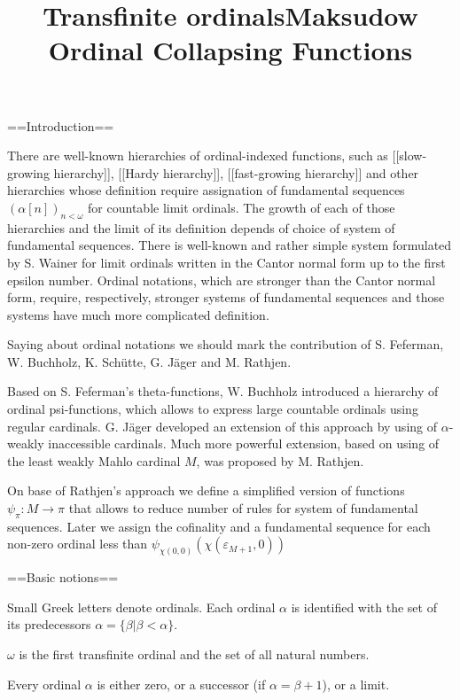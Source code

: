 \documentclass[10pt]{article}
\title{Transfinite ordinals}
\begin{document}
\title{Maksudow Ordinal Collapsing Functions}

\maketitle

\setlength{\parindent}{0pt}


==Introduction==

There are well-known hierarchies of ordinal-indexed functions, such as [[slow-growing hierarchy]], [[Hardy hierarchy]], [[fast-growing hierarchy]] and other hierarchies whose definition require assignation of fundamental sequences \((\alpha[n])_{n<\omega}\) for countable limit ordinals. The growth of each of those hierarchies and the limit of its definition depends of choice of system of fundamental sequences. There is well-known and rather simple system formulated by S. Wainer for limit ordinals written in the Cantor normal form up to the first epsilon number. Ordinal notations, which are stronger than the Cantor normal form, require, respectively, stronger systems of fundamental sequences and those systems have much more complicated definition.

Saying about ordinal notations we should mark the contribution of  S. Feferman, W. Buchholz,  K. Schütte, G. Jäger and  M. Rathjen. 

Based on S. Feferman’s theta-functions, W. Buchholz introduced a hierarchy of ordinal psi-functions, which allows to express large countable ordinals using regular cardinals. G. Jäger developed an extension of this approach by using of \(\alpha\)-weakly inaccessible cardinals. Much more powerful extension, based on using of the least weakly Mahlo cardinal \(M\), was proposed by M. Rathjen.  

On base of Rathjen’s approach we define a simplified version of functions  \(\psi_\pi: M\rightarrow \pi\)  that allows to reduce number of rules for system of fundamental sequences. Later we assign the cofinality and a fundamental sequence for each non-zero ordinal less than \(\psi_{\chi(0,0)}(\chi(\varepsilon_{M+1},0))\)


==Basic notions==

Small Greek letters denote ordinals. Each ordinal \(\alpha\) is identified with the set of its predecessors \(\alpha=\{\beta|\beta<\alpha\}\). 

\(\omega\) is the first transfinite ordinal and the set of all natural numbers.

Every ordinal \(\alpha\) is either zero, or a successor (if \(\alpha=\beta+1\)), or a limit.  
\end{document}
